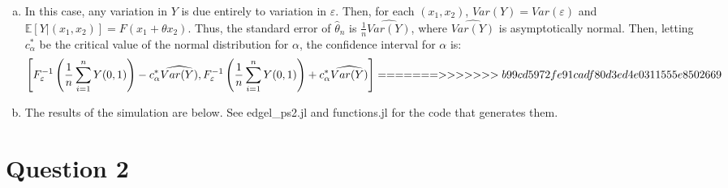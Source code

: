 \documentclass{article}
\newcommand{\est}[1]{\frac{1}{\lowercase{#1}}\sum_{i=1}^{\lowercase{#1}}}
\newcommand{\that}{\hat{\theta}_n}
\newcommand{\E}[1]{\mathbb{E}\left[#1\right]}%
\begin{document}
\begin{enumerate}[(a)]
    \item In this case, any variation in $Y$ is due entirely to variation in $\varepsilon$. Then, for each $(x_1, x_2)$, $Var(Y) = Var(\varepsilon)$ and $\E{Y|(x_1, x_2)} = F(x_1 + \theta x_2)$. Thus, the standard error of $\that$ is $\frac{1}{n}\widehat{Var(Y)}$, where $\widehat{Var(Y)}$ is asymptotically normal. Then, letting $c^*_\alpha$ be the critical value of the normal distribution for $\alpha$, the confidence interval for $\alpha$ is:\[
        \left[F_\varepsilon^{-1}\left(\est{n}Y(0,1)\right) - c^*_\alpha\widehat{Var(Y)}, F_\varepsilon^{-1}\left(\est{n}Y(0,1)\right) + c^*_\alpha\widehat{Var(Y)}\right]
=======
>>>>>>> b99cd5972fe91cadf80d3ed4e0311555e8502669
    \]

    \item The results of the simulation are below. See edgel\_ps2.jl and functions.jl for the code that generates them.
        \begin{center}
            
        \end{center}
\end{enumerate}
\pagebreak
\section*{Question 2}
\end{document}
